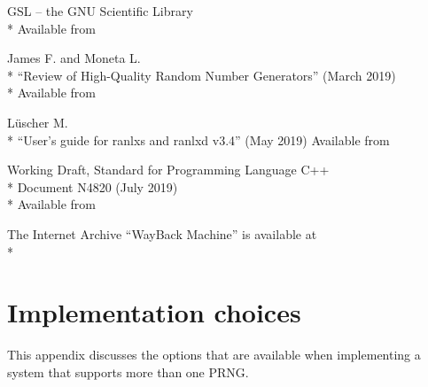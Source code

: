 \documentclass[letterpaper,12pt]{article}
\begin{document}
\begin{thebibliography}{99}
\begin{samepage}
  GSL -- the GNU Scientific Library\\*
  Available from 
\end{samepage}

\begin{samepage}
  James F. and Moneta L.\\*
  ``Review of High-Quality Random Number Generators'' (March 2019)\\*
  Available from 
\end{samepage}

\begin{samepage}
  L\"uscher M.\\*
  ``User's guide for ranlxs and ranlxd v3.4'' (May 2019)
  Available from 
\end{samepage}

\begin{samepage}
  Working Draft, Standard for Programming Language C++\\*
  Document N4820 (July 2019)\\*
  Available from 
\end{samepage}    

  The Internet Archive ``WayBack Machine'' is available at\\*
  
\end{thebibliography}




\appendix
\renewcommand{\thesection}{Appendix \Alph{section}}
\pagebreak
\section{Implementation choices}
This appendix discusses the options that are available when
implementing a system that supports more than one PRNG.
\end{document}
